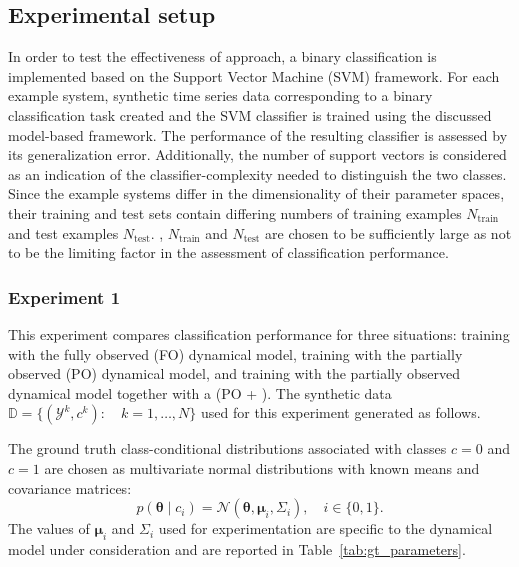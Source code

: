 \subsection{Experimental setup}\label{sec:accuracy}
In order to test the effectiveness of \myMethod{} approach, a binary classification is implemented based on the Support Vector Machine (SVM) framework. 
For each example system, synthetic time series data corresponding to a binary classification task  created and the SVM classifier is trained using the discussed model-based framework. 
The performance of the resulting classifier is assessed by its generalization error. 
Additionally, the number of support vectors is considered as an indication of the classifier-complexity needed to distinguish the two classes. 
Since the example systems differ in the dimensionality of their parameter spaces, their training and test sets contain differing numbers of training examples $N_{\text{train}}$ and test examples $N_{\text{test}}$.
, $N_{\text{train}}$ and $N_{\text{test}}$ are chosen to be sufficiently large as not to be the limiting factor in the assessment of classification performance.

\subsubsection{Experiment 1}
This experiment compares classification performance for three situations: training with the fully observed (FO) dynamical model, training with the partially observed (PO) dynamical model, and training with the partially observed dynamical model together with a \myMethod{} (PO + \myMethod{}).
The synthetic data $\mathbb{D} = \{ (\mathcal{Y}^{k},c^{k}): \quad k = 1,\ldots,N \}$ used for this experiment  generated as follows. 

The ground truth class-conditional distributions associated with classes $c=0$ and $c=1$ are chosen as multivariate normal distributions with known means and covariance matrices: %
\begin{equation}
    p(\boldsymbol{\theta} \mid c_{i}) = \mathcal{N}(\boldsymbol{\theta}, \boldsymbol{\mu}_i, \Sigma_{i}), \quad i \in\{0, 1\}.%
\end{equation}
The values of $\boldsymbol{\mu}_{i}$ and $\Sigma_{i}$ used for experimentation are specific to the dynamical model under consideration and are reported in Table~\ref{tab:gt_parameters}.

